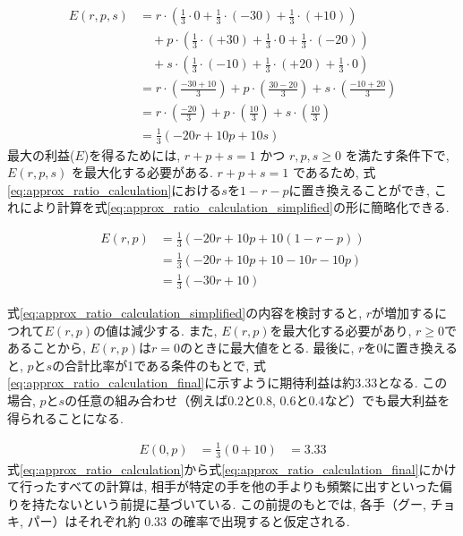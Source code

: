 \documentclass[a4j, 12pt ]{jarticle}
\begin{document}
\begin{equation}\label{eq:approx_ratio_calculation}
  \begin{aligned}
    E(r,p,s) &= r \cdot \left( \frac{1}{3} \cdot 0 + \frac{1}{3} \cdot (-30) + \frac{1}{3} \cdot (+10) \right) \\
    &\quad + p \cdot \left( \frac{1}{3} \cdot (+30) + \frac{1}{3} \cdot 0 + \frac{1}{3} \cdot (-20) \right) \\
    &\quad + s \cdot \left( \frac{1}{3} \cdot (-10) + \frac{1}{3} \cdot (+20) + \frac{1}{3} \cdot 0 \right) \\
    &= r \cdot \left( \frac{-30 + 10}{3} \right) + p \cdot \left( \frac{30 - 20}{3} \right) + s \cdot \left( \frac{-10 + 20}{3} \right) \\
    &= r \cdot \left( \frac{-20}{3} \right) + p \cdot \left( \frac{10}{3} \right) + s \cdot \left( \frac{10}{3} \right) \\
    &= \frac{1}{3} \left( -20r + 10p + 10s \right)
  \end{aligned}
\end{equation}
最大の利益($E$)を得るためには, $r + p + s = 1$ かつ $r, p, s \geq 0$ を満たす条件下で, $E(r, p, s)$ を最大化する必要がある. $r + p + s = 1$ であるため, 式\ref{eq:approx_ratio_calculation}における$s$を$1 - r - p$に置き換えることができ, これにより計算を式\ref{eq:approx_ratio_calculation_simplified}の形に簡略化できる.

\begin{equation}\label{eq:approx_ratio_calculation_simplified}
  \begin{aligned}
    E(r, p) &= \frac{1}{3} \left( -20r + 10p + 10(1 - r - p) \right) \\
            &= \frac{1}{3} \left( -20r + 10p + 10 - 10r - 10p \right) \\
            &= \frac{1}{3} \left( -30r + 10 \right)
  \end{aligned}
\end{equation}

式\ref{eq:approx_ratio_calculation_simplified}の内容を検討すると, $r$が増加するにつれて$E(r, p)$の値は減少する. また, $E(r, p)$を最大化する必要があり, $r \geq 0$であることから, $E(r, p)$は$r = 0$のときに最大値をとる. 最後に, $r$を0に置き換えると, $p$と$s$の合計比率が1である条件のもとで, 式\ref{eq:approx_ratio_calculation_final}に示すように期待利益は約$3.33$となる. この場合, $p$と$s$の任意の組み合わせ（例えば$0.2$と$0.8$, $0.6$と$0.4$など）でも最大利益を得られることになる.

\begin{equation}\label{eq:approx_ratio_calculation_final}
  \begin{aligned}
    E(0, p) &= \frac{1}{3} \left( 0 + 10 \right) &= 3.33
  \end{aligned}
\end{equation}
式\ref{eq:approx_ratio_calculation}から式\ref{eq:approx_ratio_calculation_final}にかけて行ったすべての計算は, 相手が特定の手を他の手よりも頻繁に出すといった偏りを持たないという前提に基づいている. この前提のもとでは, 各手（グー, チョキ, パー）はそれぞれ約 0.33 の確率で出現すると仮定される.\\
\end{document}
